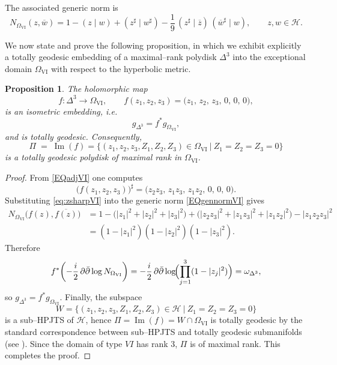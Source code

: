 \documentclass[reqno, 11pt]{amsart}
\newtheorem{prop}[theor]{Proposition}
\newcommand{\ov}[1]{\overline{#1}}
\begin{document}
The associated generic norm is
\begin{equation}\label{EQgennormVI}
N_{\Omega_{\mathrm{VI}}}(z,\ov w)
=
1-(z\mid w)+(z^{\sharp}\mid w^{\sharp})-
\frac{1}{9}\,(z^{\sharp}\mid\ov z)\,{(\ov w^{\sharp}\mid w)},
\qquad z,w\in\mathcal H.
\end{equation}



\vskip0.2cm

We now state and prove the following proposition, in which we exhibit explicitly a totally geodesic embedding of a maximal–rank polydisk $\Delta^3$ into the exceptional domain $\Omega_{\mathrm{VI}}$ with respect to the hyperbolic metric.

\begin{prop}\label{PROPpolymaxVI}
The holomorphic map
\[
f \colon \Delta^3 \longrightarrow \Omega_{\mathrm{VI}},
\qquad
f(z_{1},z_{2},z_{3})
=\bigl(z_{1},\,z_{2},\,z_{3},\,0,\,0,\,0\bigr),
\]
is an isometric embedding, i.e.
\[
g_{\Delta^3}=f^{*}g_{\Omega_{\mathrm{VI}}},
\]
and is totally geodesic. Consequently,
\[
\Pi \;=\;\operatorname{Im}(f)
=\bigl\{(z_{1},z_{2},z_{3},Z_{1},Z_{2},Z_{3})\in\Omega_{\mathrm{VI}}
\ \big|\ Z_{1}=Z_{2}=Z_{3}=0\bigr\}
\]
is a totally geodesic polydisk of maximal rank in $\Omega_{\mathrm{VI}}$.
\end{prop}

\begin{proof}
From \eqref{EQadjVI} one computes
\begin{equation}\label{eq:zsharpVI}
\bigl(f(z_{1},z_{2},z_{3})\bigr)^{\sharp}
=\bigl(z_{2}z_{3},\,z_{1}z_{3},\,z_{1}z_{2},\,0,\,0,\,0\bigr).
\end{equation}
Substituting \eqref{eq:zsharpVI} into the generic norm \eqref{EQgennormVI}  gives
\begin{equation}\label{eq:gennormVI}
\begin{aligned}
N_{\Omega_{\mathrm{VI}}}\bigl(f(z),\overline{f(z)}\bigr)
&=1-\bigl(|z_{1}|^{2}+|z_{2}|^{2}+|z_{3}|^{2}\bigr)
+\bigl(|z_{2}z_{3}|^{2}+|z_{1}z_{3}|^{2}+|z_{1}z_{2}|^{2}\bigr)
-|z_{1}z_{2}z_{3}|^{2}\\
&=(1-|z_{1}|^{2})(1-|z_{2}|^{2})(1-|z_{3}|^{2}).
\end{aligned}
\end{equation}
Therefore
\[
f^{*}\!\left(-\frac{i}{2}\,\partial\bar\partial\log N_{\Omega_{\mathrm{VI}}}\right)
=-\frac{i}{2}\,\partial\bar\partial\log\!\Bigl(\prod_{j=1}^3(1-|z_j|^2)\Bigr)
=\omega_{\Delta^{3}},
\]
so $g_{\Delta^{3}}=f^{*}g_{\Omega_{\mathrm{VI}}}$. Finally, the subspace
\[
W=\bigl\{(z_{1},z_{2},z_{3},Z_{1},Z_{2},Z_{3})\in\mathcal{H}\ \big|\ Z_{1}=Z_{2}=Z_{3}=0\bigr\}
\]
is a sub–HPJTS of $\mathcal H$, hence $\Pi=\operatorname{Im}(f)=W\cap\Omega_{\mathrm{VI}}$ is totally geodesic by the standard correspondence between sub–HPJTS and totally geodesic submanifolds (see \cite[Prop.~2.1]{DISCALALOI2008sympdual}).  Since the domain of type \(VI\) has rank \(3\), \(\Pi\) is of maximal rank.
This completes the proof.
\end{proof}
\end{document}
